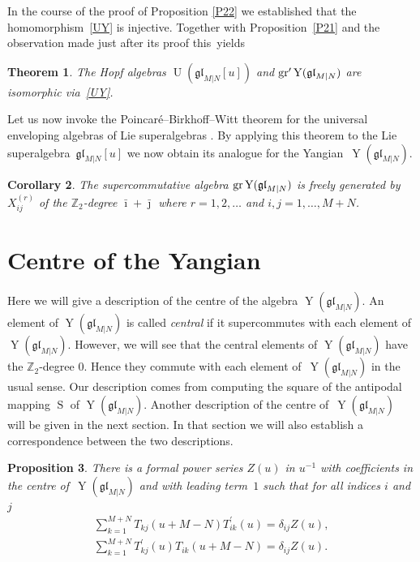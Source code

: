 \documentclass[10pt,a4paper]{amsart}
\numberwithin{equation}{section}
\newtheorem{Theorem}{Theorem}[section]
\newtheorem{Corollary}[Theorem]{Corollary}
\newtheorem{Proposition}[Theorem]{Proposition}
\def\bi{{\bar\imath }}
\def\bj{{\bar\jmath }}
\def\g{\glMN [u]}
\def\glMN{\mathfrak{gl}_{M|N}}
\def\gr{{\rm gr} }
\def\grpr{{\rm gr}^{\prime} }
\def\S{\operatorname{S}}
\def\TP{T^{\prime}}
\def\Ug{\operatorname{U}(\g)}
\def\YMN{\operatorname{Y}(\glMN)}
\def\ZZ{\mathbb{Z}}
\begin{document}
In the course of the proof of Proposition \ref{P22} we established that
the homomorphism~\eqref{UY} is injective.
Together with Proposition~\ref{P21}
and the observation made just after its proof this~yields

\begin{Theorem}\label{T18}The Hopf algebras $\Ug$ and $\grpr\YMN$ are isomorphic via~\eqref{UY}.
\end{Theorem}

Let us now invoke the Poincar\'e--Birkhoff--Witt theorem for the universal
enveloping algebras of Lie superalgebras \cite[Theorem~5.15]{MM}.
By applying this theorem to
the Lie superalgebra~$\g$ we now obtain its analogue
for the Yangian~$\YMN $.

\begin{Corollary}The supercommutative algebra $\gr\YMN$ is freely generated
by $X_{ij}^{(r)}$ of the $\ZZ_2$-degree $\bi+\bj$
where $r=1 ,2 , \dots$ and $i ,j=1 ,\dots, M+N $.
\end{Corollary}

\section{Centre of the Yangian}\label{sec:2}

Here we will give a description of the centre of the
algebra $\YMN $. An element of $\YMN$ is called
\emph {central} if it supercommutes with each element of $\YMN $.
However, we will see that the central elements of $\YMN$ have
the $\ZZ_{2}$-degree $0 $.
Hence they commute with each
element of~$\YMN$ in the usual sense.
Our description comes from computing the square of the antipodal mapping $\S$ of $\YMN $.
Another description of the centre of~$\YMN $ will be
given in the next section. In that section we will also establish a
correspondence between the two descriptions.

\begin{Proposition}\label{zu} There is a formal power series $Z(u)$ in $u^{-1}$ with coefficients in
the centre of~$\YMN$ and with
leading term~$1$ such that for all indices $i$ and $j$
\begin{gather}\label{zetav}
\sum_{k=1}^{M+N}T_{kj}(u+M-N) \TP_{ik}(u) =\delta_{ij} Z(u) ,\\
\label{zetau}
\sum_{k=1}^{M+N}
\TP_{kj}(u) T_{ik}(u+M-N) =\delta_{ij} Z(u) .
\end{gather}
\end{Proposition}
\end{document}
